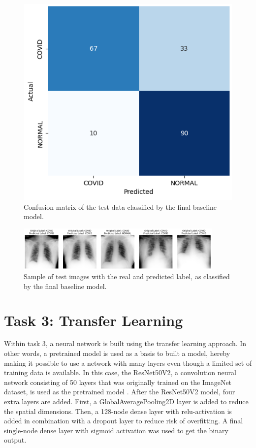 \documentclass[conference]{IEEEtran}
\begin{document}
\begin{figure}[h] \centering 						\includegraphics[width=0.9\columnwidth]{fig_task2_confusionmatrix.png} 
	\caption{Confusion matrix of the test data classified by the final baseline model.} 
	\label{fig:task2_confusionmatrix} 
\end{figure}


\begin{figure}[h] \centering \includegraphics[width=0.9\textwidth]{fig_task2_examples_images_label_vs_predictedlabel.png} 
	\caption{Sample of test images with the real and predicted label, as classified by the final baseline model.} 
	\label{fig:task2_image_examples} 
\end{figure}


\section{Task 3: Transfer Learning}\label{sec:task_3}


Within task 3, a neural network is built using the transfer learning approach. In other words, a pretrained model is used as a basis to built a model, hereby making it possible to use a network with many layers even though a limited set of training data is available. 
In this case, the ResNet50V2, a convolution neural network consisting of 50 layers that was originally trained on the ImageNet dataset, is used as the pretrained model \cite{resnet}. After the ResNet50V2 model, four extra layers are added. First, a GlobalAveragePooling2D layer is added to reduce the spatial dimensions. Then, a 128-node dense layer with relu-activation is added in combination with a dropout layer to reduce risk of overfitting. A final single-node dense layer with sigmoid activation was used to get the binary output.
\end{document}
